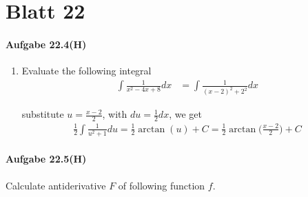 \section*{Blatt 22}

\newpage

\paragraph{Aufgabe 22.4(H)}

\begin{enumerate}

\item[]

Evaluate the following integral
\begin{align}
\int\frac{1}{x^2-4x+8}dx
&=
\int\frac{1}{(x-2)^2+2^2}dx
\end{align}

substitute $u=\frac{x-2}{2}$, with $du=\frac{1}{2}dx$, we get
\begin{align}
\frac{1}{2}\int\frac{1}{u^2+1}du=\frac{1}{2}\arctan(u)+C=\frac{1}{2}\arctan\bigg(\frac{x-2}{2}\bigg)+C
\end{align}

\end{enumerate}

\paragraph{Aufgabe 22.5(H)}

Calculate antiderivative $F$ of following function $f$.

